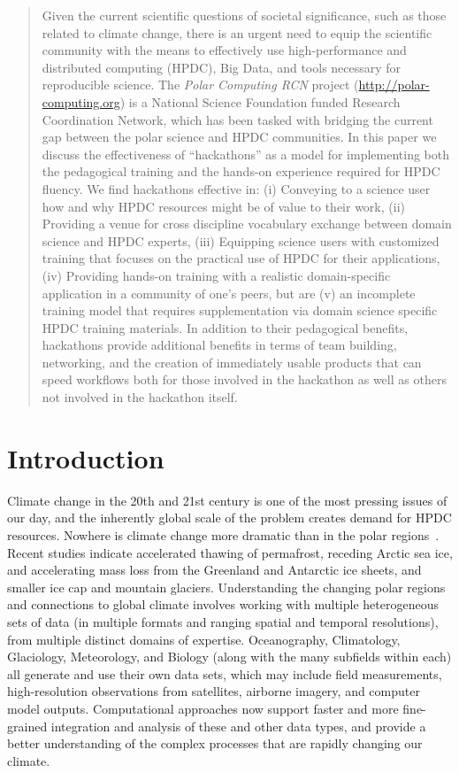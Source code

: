 \documentclass[conference]{IEEEtran}
\begin{document}
\begin{abstract}
Given the current scientific questions of societal significance, such as those related to climate change, there is an urgent need to equip the scientific community with the means to effectively use high-performance and distributed computing (HPDC), Big Data, and tools necessary for reproducible science.  The {\it Polar Computing RCN} project (\url{http://polar-computing.org}) is a National Science Foundation funded Research Coordination Network, which has been tasked with bridging the current gap between the polar science and HPDC communities. In this paper we discuss the effectiveness of ``hackathons'' as a model for implementing both the pedagogical training and the hands-on experience required for HPDC fluency.  We find hackathons effective in: (i) Conveying to a science user how and why HPDC resources might be of value to their work, (ii) Providing a venue for cross discipline vocabulary exchange between domain science and HPDC experts, (iii) Equipping science users with customized training that focuses on the practical use of HPDC for their applications, (iv) Providing hands-on training with a realistic domain-specific application in a community of one's peers, but are (v) an incomplete training model that requires supplementation via domain science specific HPDC training materials. In addition to their pedagogical benefits, hackathons provide additional benefits in terms of team building, networking, and the creation of immediately usable products that can speed workflows both for those involved in the hackathon as well as others not involved in the hackathon itself. 
\end{abstract}


\section{Introduction}
Climate change in the 20th and 21st century is one of the most pressing issues of our day, and the inherently global scale of the problem creates demand for HPDC resources. Nowhere is climate change more dramatic than in the polar regions~\cite{Nelson2007}. Recent studies indicate accelerated thawing of permafrost, receding Arctic sea ice, and accelerating mass loss from the Greenland and Antarctic ice sheets, and smaller ice cap and mountain glaciers. Understanding the changing polar regions and connections to global climate involves working with multiple heterogeneous sets of data (in multiple formats and ranging spatial and temporal resolutions), from multiple distinct domains of expertise. Oceanography, Climatology, Glaciology, Meteorology, and Biology (along with the many subfields within each) all generate and use their own data sets, which may include field measurements, high-resolution observations from satellites, airborne imagery, and computer model outputs. Computational approaches now support faster and more fine-grained integration and analysis of these and other data types, and provide a better understanding of the complex processes that are rapidly changing our climate.  
\end{document}

